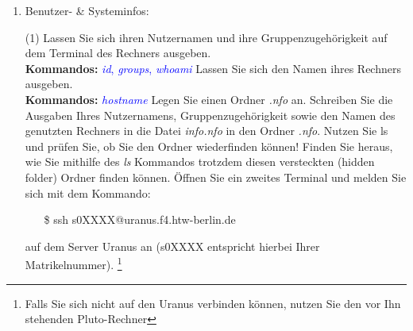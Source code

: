 \documentclass[paper=a4,fontsize=11pt]{scrartcl}%
\numberwithin{equation}{section}
\begin{document}
{\begin{enumerate}
\begin{tasks}
		\task Navigieren Sie in Ihr Heimatverzeichnis. Legen Sie folgenden Ordner, sowie Unterordner mithilfe des \emph{mkdir}-Kommandos an: .
		\task Kopieren Sie die Datei bzw. den Ordner \emph{shell\_tutorial} in das eben angelegte Verzeichnis.\\
		\textbf{Kommandos:} \textcolor{blue}{\emph{cp} }
        \task Kopieren Sie die Datei(en) inklusive des Ordners  in das Verzeichnis .\\
        \textbf{Hinweise:} Schauen Sie in die Manpage von cp um herauszufinden, wie Ordner kopiert werden können.\\
        \textbf{Kommandos:} \textcolor{blue}{\emph{man cp}}
        \end{tasks}
        \footnote{.md steht für Markdown, welches ein Format für Textdateien ist, ähnlich wie .pdf oder .doc-Dateien.}
        \footnote{\url{https://github.com/retext-project}}
         \footnote{Sie können auch mit vi, vim oder emacs arbeiten!}
  \item Benutzer- \& Systeminfos:
        \begin{tasks}(1)       
          \task Lassen Sie sich ihren Nutzernamen und ihre Gruppenzugehörigkeit auf dem Terminal des Rechners ausgeben.\\
          \textbf{Kommandos:} \textcolor{blue}{\emph{id}, \emph{groups}, \emph{whoami}}
          \task Lassen Sie sich den Namen ihres Rechners ausgeben.\\
          \textbf{Kommandos:} \textcolor{blue}{\emph{hostname}}
          \task Legen Sie einen Ordner \emph{.nfo} an. Schreiben Sie die Ausgaben Ihres Nutzernamens, Gruppenzugehörigkeit sowie den Namen des genutzten Rechners in die Datei \emph{info.nfo} in den Ordner \emph{.nfo}.
          \task Nutzen Sie ls und prüfen Sie, ob Sie den Ordner wiederfinden können! Finden Sie heraus, wie Sie mithilfe des \emph{ls} Kommandos trotzdem diesen versteckten (hidden folder) Ordner finden können.   
          \task Öffnen Sie ein zweites Terminal und melden Sie sich mit dem Kommando:
          \begin{itemize}
          \item[\$]ssh s0XXXX@uranus.f4.htw-berlin.de
          \end{itemize}
           auf dem Server Uranus an (s0XXXX entspricht hierbei Ihrer Matrikelnummer). \footnote{Falls Sie sich nicht auf den Uranus verbinden können, nutzen Sie den vor Ihn stehenden Pluto-Rechner} \\

\end{tasks}
\end{enumerate}}
\end{document}

